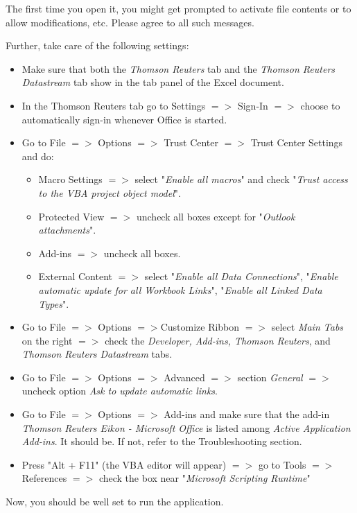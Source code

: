 The first time you open it, you might get prompted to activate file contents or to allow modifications, etc. Please agree to all such messages. 

Further, take care of the following settings: 
\begin{itemize}
	\item Make sure that both the \textit{Thomson Reuters} tab and the \textit{Thomson Reuters Datastream} tab show in the tab panel of the Excel document. 
	\item In the Thomson Reuters tab go to Settings $=>$ Sign-In $=>$ choose to automatically sign-in whenever Office is started. 
	\item Go to File $ => $ Options $ => $ Trust Center $ => $ Trust Center Settings and do: 
	\begin{itemize}
		\item Macro Settings $ => $ select "\textit{Enable all macros}" and check "\textit{Trust access to the VBA project object model}". 
		\item Protected View $ => $ uncheck all boxes except for "\textit{Outlook attachments}". 
		\item Add-ins $ => $ uncheck all boxes.
		\item External Content $ => $ select "\textit{Enable all Data Connections}", "\textit{Enable automatic update for all Workbook Links}", "\textit{Enable all Linked Data Types}".
	\end{itemize}
	\item Go to File $ => $ Options $ =>  $Customize Ribbon $ => $ select \textit{Main Tabs} on the right $ => $ check the \textit{Developer, Add-ins, Thomson Reuters}, and \textit{Thomson Reuters Datastream} tabs. 
	\item Go to File $ => $ Options $ => $ Advanced $ => $ section \textit{General} $ => $ uncheck option \textit{Ask to update automatic links}. 
	\item Go to File $ => $ Options $ => $ Add-ins and make sure that the add-in \textit{Thomson Reuters Eikon - Microsoft Office }is listed among \textit{Active Application Add-ins}. It should be. If not, refer to the Troubleshooting section. 
	\item Press "Alt + F11" (the VBA editor will appear) $ => $ go to Tools $ => $ References $ => $ check the box near "\textit{Microsoft Scripting Runtime}"
\end{itemize}

Now, you should be well set to run the application.

